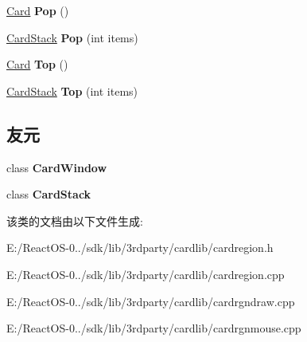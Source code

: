 \begin{DoxyCompactItemize}
\hyperlink{class_card}{Card} {\bfseries Pop} ()
\item 
\mbox{\label{class_card_region_a90fd722ec6e5976d009038076bc9b3fb}} 
\hyperlink{class_card_stack}{Card\+Stack} {\bfseries Pop} (int items)
\item 
\mbox{\label{class_card_region_ad5f9f3cf20f643779902d744641fb79c}} 
\hyperlink{class_card}{Card} {\bfseries Top} ()
\item 
\mbox{\label{class_card_region_a359faf44a7a46ada55b376f8051ef536}} 
\hyperlink{class_card_stack}{Card\+Stack} {\bfseries Top} (int items)
\end{DoxyCompactItemize}
\subsection*{友元}
\begin{DoxyCompactItemize}
\item 
\mbox{\label{class_card_region_ab011d0f3b2396b3aacec9f12fc70b779}} 
class {\bfseries Card\+Window}
\item 
\mbox{\label{class_card_region_a9a1d66e122f537626f29525c9a1a5c99}} 
class {\bfseries Card\+Stack}
\end{DoxyCompactItemize}


该类的文档由以下文件生成\+:\begin{DoxyCompactItemize}
\item 
E\+:/\+React\+O\+S-\/0../sdk/lib/3rdparty/cardlib/cardregion.\+h\item 
E\+:/\+React\+O\+S-\/0../sdk/lib/3rdparty/cardlib/cardregion.\+cpp\item 
E\+:/\+React\+O\+S-\/0../sdk/lib/3rdparty/cardlib/cardrgndraw.\+cpp\item 
E\+:/\+React\+O\+S-\/0../sdk/lib/3rdparty/cardlib/cardrgnmouse.\+cpp\end{DoxyCompactItemize}
